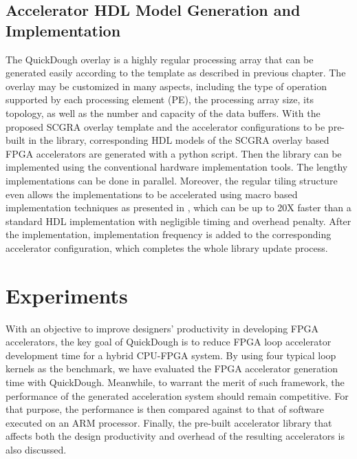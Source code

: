 \subsection{Accelerator HDL Model Generation and Implementation}
The QuickDough overlay is a highly regular processing array that can be generated easily according to the template as described in previous chapter. The overlay may be customized in many aspects, including the type of operation supported by each processing element (PE), the processing array size, its topology, as well as the number and capacity of the data buffers. With the proposed SCGRA overlay template and the accelerator configurations to be pre-built in the library, corresponding HDL models of the SCGRA overlay based FPGA accelerators are generated with a python script. Then the library can be implemented using the conventional hardware implementation tools. The lengthy implementations can be done in parallel. Moreover, the regular tiling structure even allows the implementations to be accelerated using macro based implementation techniques as presented in \cite{yue2015rapid}, which can be up to 20X faster than a standard HDL implementation with negligible timing and overhead penalty. After the implementation, implementation frequency is added to the corresponding accelerator configuration, which completes the whole library update process.

\section{Experiments}
With an objective to improve designers' productivity in developing FPGA accelerators, the key goal of QuickDough is to reduce FPGA loop accelerator development time for a hybrid CPU-FPGA system. By using four typical loop kernels as the benchmark, we have evaluated the FPGA accelerator generation time with QuickDough. Meanwhile, to warrant the merit of such framework, the performance of the generated acceleration system should remain competitive. For that purpose, the performance is then compared against to that of software executed on an ARM processor. Finally, the pre-built accelerator library that affects both the design productivity and overhead of the resulting accelerators is also
discussed.


